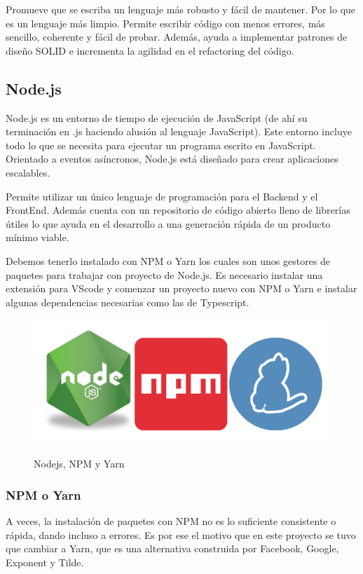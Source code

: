 \documentclass[12pt,twoside,titlepage]{report}
\begin{document}
Promueve que se escriba un lenguaje más robusto y fácil de mantener. Por lo que es un lenguaje más limpio. Permite escribir código con menos errores, más sencillo, coherente y fácil de probar. Además, ayuda a implementar patrones de diseño SOLID e incrementa la agilidad en el refactoring del código.

\subsection{Node.js}

Node.js es un entorno de tiempo de ejecución de JavaScript (de ahí su terminación en .js haciendo alusión al lenguaje JavaScript). Este entorno incluye todo lo que se necesita para ejecutar un programa escrito en JavaScript. Orientado a eventos asíncronos, Node.js está diseñado para crear aplicaciones escalables.

Permite utilizar un único lenguaje de programación para el Backend y el FrontEnd. Además cuenta con un repositorio de código abierto lleno de librerías útiles lo que ayuda en el desarrollo a una generación rápida de un producto mínimo viable.

Debemos tenerlo instalado con NPM o Yarn los cuales son unos gestores de paquetes para trabajar con proyecto de Node.js. Es necesario instalar una extensión para VScode y comenzar un proyecto nuevo con NPM o Yarn e instalar algunas dependencias necesarias como las de Typescript.

\begin{figure}[H]
    \centering
    \includegraphics[scale=0.1]{Nodejs/NodeNPMYarn}
    \label{fig:NodeNPMYarn}
    \caption{Nodejs, NPM y Yarn}
\end{figure}

\subsubsection{NPM o Yarn}

A veces, la instalación de paquetes con NPM no es lo suficiente consistente o rápida, dando incluso a errores. Es por ese el motivo que en este proyecto se tuvo que cambiar a Yarn, que es una alternativa construida por Facebook, Google, Exponent y Tilde.
\end{document}
